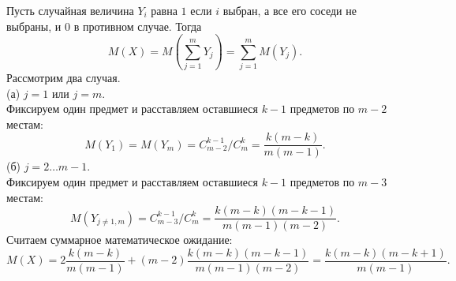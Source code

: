 \documentclass{article}
\begin{document}
Пусть случайная величина $Y_i$ равна $1$ если $i$ выбран, а все его соседи не выбраны, и $0$ в противном случае. Тогда
$$M(X) = M \left( \sum\limits_{j=1}^m Y_j \right) = \sum\limits_{j=1}^m M(Y_j).$$
Рассмотрим два случая.\\
(а) $j = 1$ или $j=m$.\\
Фиксируем один предмет и расставляем оставшиеся $k-1$ предметов по $m-2$ местам:
$$M(Y_1) = M(Y_m) = C_{m-2}^{k-1} / C_m^k = \frac{k(m-k)}{m(m-1)}.$$
(б) $j=2\ldots m-1$.\\
Фиксируем один предмет и расставляем оставшиеся $k-1$ предметов по $m-3$ местам:
$$M(Y_{j\neq 1,m}) = C_{m-3}^{k-1} / C_m^k = \frac{k(m-k)(m-k-1)}{m(m-1)(m-2)}.$$
Считаем суммарное математическое ожидание:
$$M(X) = 2 \frac{k(m-k)}{m(m-1)} + (m-2) \frac{k(m-k)(m-k-1)}{m(m-1)(m-2)} = \frac{k(m-k)(m-k+1)}{m(m-1)}.$$
\end{document}
